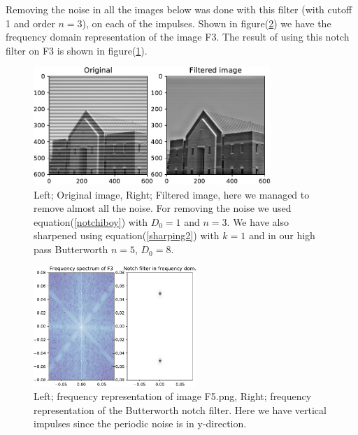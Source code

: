 {Removing the noise in all the images below was done with this filter (with cutoff 1 and order $n = 3$), on each of the impulses. Shown in figure(\ref{C7F3freq}) we have the frequency domain representation of the image F3. The result of using this notch filter on F3 is shown in figure(\ref{C7F3}).

\begin{figure}[!htb]
    {\centering
        \includegraphics[width=0.80\textwidth]{C7F3.pdf}
        \caption{Left; Original image, Right; Filtered image, here we managed to remove almost all the noise. For removing the noise we used equation(\ref{notchiboy}) with $D_{0} = 1$ and $n = 3$.  We have also sharpened using equation(\ref{sharping2}) with $k = 1$ and in our high pass Butterworth $n = 5$, $D_{0} = 8$.}
        \label{C7F3}
    \par}
    \end{figure}



    \begin{figure}[!htb]
        {\centering
            \includegraphics[width=0.55\textwidth]{C7F3freq.pdf}
            \caption{Left; frequency representation of image F5.png, Right; frequency representation of the Butterworth notch filter. Here we have vertical impulses since the periodic noise is in y-direction.}
            \label{C7F3freq}
        \par}
        \end{figure}

}
